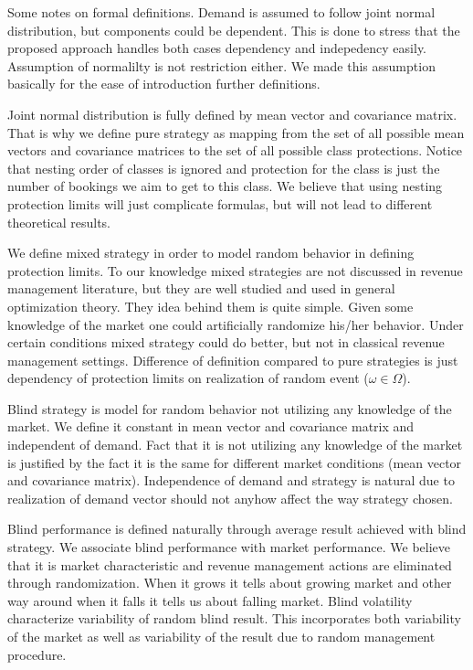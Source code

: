 \documentclass[a4paper,oneside]{article}
\begin{document}
  Some notes on formal definitions. Demand is assumed to follow joint normal distribution,
  but components could be dependent. This is done to stress that the proposed approach 
  handles both cases dependency and indepedency easily. Assumption of normalilty is not
  restriction either. We made this assumption basically for the ease of introduction further 
  definitions. 

  Joint normal distribution is fully defined by mean vector and covariance matrix. That is why
  we define pure strategy as mapping from the set of all possible mean vectors and covariance
  matrices to the set of all possible class protections. Notice that nesting order of classes
  is ignored and protection for the class is just the number of bookings we aim to get to this 
  class. We believe that using nesting protection limits will just complicate formulas, but
  will not lead to different theoretical results.

  We define mixed strategy in order to model random behavior in defining protection limits.
  To our knowledge mixed strategies are not discussed in revenue management literature, but
  they are well studied and used in general optimization theory. They idea behind them is
  quite simple. Given some knowledge of the market one could artificially randomize his/her
  behavior. Under certain conditions mixed strategy could do better, but not in classical
  revenue management settings. Difference of definition compared to pure strategies is just
  dependency of protection limits on realization of random event ($\omega \in \Omega$).  

  Blind strategy is model for random behavior not utilizing any knowledge of the market.
  We define it constant in mean vector and covariance matrix and independent of demand.
  Fact that it is not utilizing any knowledge of the market is justified by the fact
  it is the same for different market conditions (mean vector and covariance matrix).
  Independence of demand and strategy is natural due to realization of demand vector
  should not anyhow affect the way strategy chosen.

  Blind performance is defined naturally through average result achieved with blind
  strategy. We associate blind performance with market performance. We believe that
  it is market characteristic and revenue management actions are eliminated through
  randomization. When it grows it tells about growing market and other way around
  when it falls it tells us about falling market.
  Blind volatility characterize variability of random blind result. This
  incorporates both variability of the market as well as variability of the result
  due to random management procedure.
\end{document}
